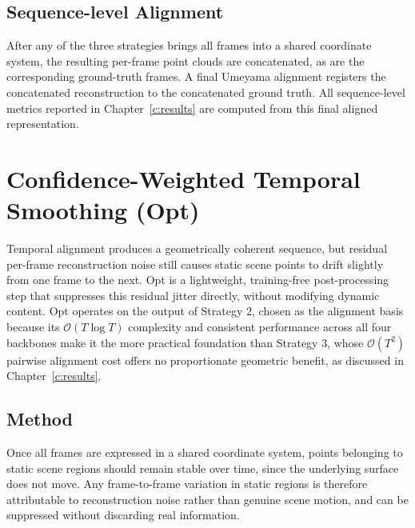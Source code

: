 \subsection{Sequence-level Alignment}
\label{sec:sequence_alignment}
After any of the three strategies brings all frames into a shared coordinate
system, the resulting per-frame point clouds are concatenated, as are the
corresponding ground-truth frames. A final Umeyama alignment registers the
concatenated reconstruction to the concatenated ground truth. All sequence-level
metrics reported in Chapter~\ref{c:results} are computed from this final aligned
representation.

\section{Confidence-Weighted Temporal Smoothing (Opt)}
\label{sec:opt}

Temporal alignment produces a geometrically coherent sequence, but residual
per-frame reconstruction noise still causes static scene points to drift slightly
from one frame to the next. Opt is a lightweight, training-free post-processing
step that suppresses this residual jitter directly, without modifying dynamic
content. Opt operates on the output of Strategy 2, chosen as the alignment
basis because its $\mathcal{O}(T \log T)$ complexity and consistent performance
across all four backbones make it the more practical foundation than Strategy 3,
whose $\mathcal{O}(T^2)$ pairwise alignment cost offers no proportionate geometric
benefit, as discussed in Chapter~\ref{c:results}.

\subsection{Method}
\label{sec:opt_method}

Once all frames are expressed in a shared coordinate system, points belonging to static
scene regions should remain stable over time, since the underlying surface does not move.
Any frame-to-frame variation in static regions is therefore attributable to reconstruction
noise rather than genuine scene motion, and can be suppressed without discarding real
information.

